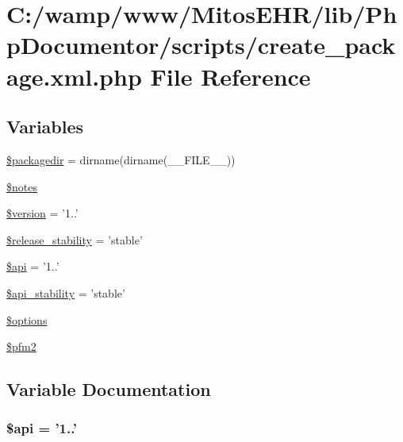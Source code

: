 \hypertarget{create__package_8xml_8php}{\section{\-C\-:/wamp/www/\-Mitos\-E\-H\-R/lib/\-Php\-Documentor/scripts/create\-\_\-package.xml.\-php \-File \-Reference}
\label{create__package_8xml_8php}
}
\subsection*{\-Variables}
\begin{DoxyCompactItemize}
\item 
\hyperlink{create__package_8xml_8php_a5db0efd0d15caecd22a51b5564c55102}{\$packagedir} = dirname(dirname(\-\_\-\-\_\-\-F\-I\-L\-E\-\_\-\-\_\-))
\item 
\hyperlink{create__package_8xml_8php_a2bfacb2c81cae66264f765b0a20599c6}{\$notes}
\item 
\hyperlink{create__package_8xml_8php_a17c8948c68aa44fa9961ae169b6a8961}{\$version} = '1..'
\item 
\hyperlink{create__package_8xml_8php_a3cc398190f086f7692e9d81b3fa49402}{\$release\-\_\-stability} = 'stable'
\item 
\hyperlink{create__package_8xml_8php_afce321e6f53c241037f871b50680cf1c}{\$api} = '1..'
\item 
\hyperlink{create__package_8xml_8php_a0c0ab875f40e54107565eec2ec55d305}{\$api\-\_\-stability} = 'stable'
\item 
\hyperlink{create__package_8xml_8php_a011800c63ece4cbbfa77136a20607023}{\$options}
\item 
\hyperlink{create__package_8xml_8php_ab441d74e03a579a4462687ed1eea12ea}{\$pfm2}
\end{DoxyCompactItemize}


\subsection{\-Variable \-Documentation}
\hypertarget{create__package_8xml_8php_afce321e6f53c241037f871b50680cf1c}{
\subsubsection[{\$api}]{\setlength{\rightskip}{0pt plus 5cm}\$api = '1..'}}\label{create__package_8xml_8php_afce321e6f53c241037f871b50680cf1c}


